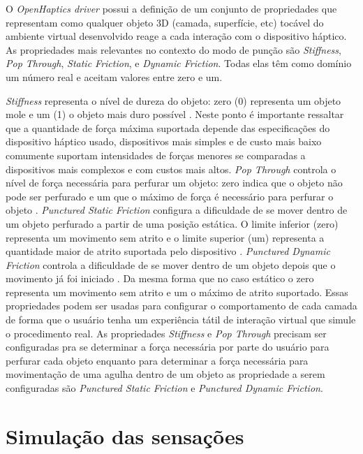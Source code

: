 O \textit{OpenHaptics driver} possui a definição de um conjunto de propriedades que representam como qualquer objeto 3D (camada, superfície, etc) tocável do ambiente virtual desenvolvido reage a cada interação com o dispositivo háptico. As propriedades mais relevantes no contexto do modo de punção são \textit{Stiffness}, \textit{Pop Through}, \textit{Static Friction}, e \textit{Dynamic Friction}. Todas elas têm como domínio um número real e aceitam valores entre zero e um. 

\textit{Stiffness} representa o nível de dureza do objeto: zero (0) representa um objeto mole e um (1) o objeto mais duro possível \cite{3DSystemsTouch2018}. Neste ponto é importante ressaltar que a quantidade de força máxima suportada depende das especificações do dispositivo háptico usado, dispositivos mais simples e de custo mais baixo comumente suportam intensidades de forças menores se comparadas a dispositivos mais complexos e com custos mais altos. \textit{Pop Through} controla o nível de força necessária para perfurar um objeto: zero indica que o objeto não pode ser perfurado e um que o máximo de força é necessário para perfurar o objeto \cite{3DSystemsTouch2018}. \textit{Punctured Static Friction} configura a dificuldade de se mover dentro de um objeto perfurado a partir de uma posição estática. O limite inferior (zero) representa um movimento sem atrito e o limite superior (um) representa a quantidade maior de atrito suportada pelo dispositivo \cite{3DSystemsTouch2018}. \textit{Punctured Dynamic Friction} controla a dificuldade de se mover dentro de um objeto depois que o movimento já foi iniciado \cite{3DSystemsTouch2018}. Da mesma forma que no caso estático o zero representa um movimento sem atrito e um o máximo de atrito suportado. Essas propriedades podem ser usadas para configurar o comportamento de cada camada de forma que o usuário tenha um experiência tátil de interação virtual que simule o procedimento real. As propriedades \textit{Stiffness} e \textit{Pop Through} precisam ser configuradas pra se determinar a força necessária por parte do usuário para perfurar cada objeto enquanto para determinar a força necessária para movimentação de uma agulha dentro de um objeto as propriedade a serem configuradas são \textit{Punctured Static Friction} e \textit{Punctured Dynamic Friction}.

\section{Simulação das sensações}
\label{sec:testeSensacoes}

